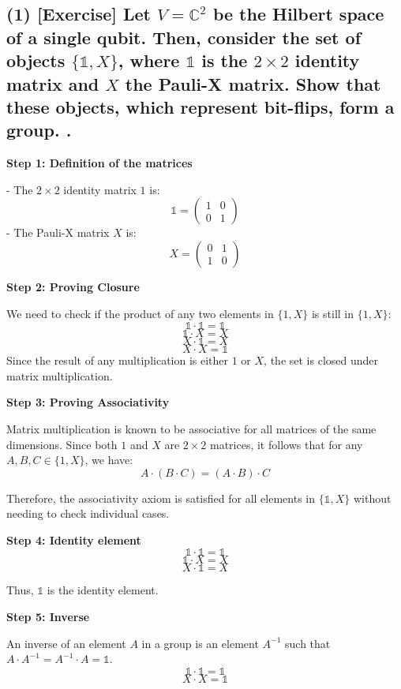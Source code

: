 \documentclass[12pt]{article}
\begin{document}
\begin{flushleft}
\subsection*{(1) [Exercise] Let \( V = \mathbb{C}^2 \) be the Hilbert space of a single qubit. Then, consider the set of objects \( \{\mathds{1}
, X\} \), where \( \mathds{1} \) is the \( 2 \times 2 \) identity matrix and \( X \) the Pauli-X matrix. Show that these objects, which represent bit-flips, form a group.
.}


\textbf{Step 1: Definition of the matrices}

- The \( 2 \times 2 \) identity matrix \( 1 \) is:
\[
\mathds{1}
 = \begin{pmatrix}
1 & 0 \\
0 & 1
\end{pmatrix}
\]
- The Pauli-X matrix \( X \) is:
\[
X = \begin{pmatrix}
0 & 1 \\
1 & 0
\end{pmatrix}
\]

\textbf{Step 2: Proving Closure}


We need to check if the product of any two elements in \( \{1, X\} \) is still in \( \{1, X\} \):
\[
\mathds{1}
 \cdot \mathds{1} = \mathds{1}
\]
\[
\mathds{1}
 \cdot X = X
\]
\[
X \cdot \mathds{1}
 = X
\]
\[
X \cdot X = \mathds{1}
\]
Since the result of any multiplication is either \( 1 \) or \( X \), the set is closed under matrix multiplication.

\textbf{Step 3: Proving Associativity}


Matrix multiplication is known to be associative for all matrices of the same dimensions. Since both \( 1 \) and \( X \) are \( 2 \times 2 \) matrices, it follows that for any \( A, B, C \in \{1, X\} \), we have:
\[
A \cdot (B \cdot C) = (A \cdot B) \cdot C
\]

Therefore, the associativity axiom is satisfied for all elements in \( \{\mathds{1}, X\} \) without needing to check individual cases.


\textbf{Step 4: Identity element}
\[
\mathds{1} \cdot \mathds{1} = \mathds{1}
\]
\[
\mathds{1} \cdot X = X
\]
\[
X \cdot \mathds{1} = X
\]

Thus, \( \mathds{1} \) is the identity element.

\textbf{Step 5: Inverse}

An inverse of an element \( A \) in a group is an element \( A^{-1} \) such that \( A \cdot A^{-1} = A^{-1} \cdot A = \mathds{1} \).
\[
\mathds{1} \cdot \mathds{1} = \mathds{1}
\]
\[
X \cdot X = \mathds{1}
\]


\end{flushleft}
\end{document}
